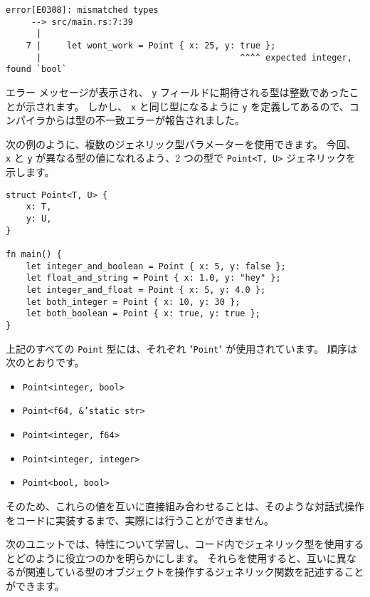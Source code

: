 \begin{lstlisting}[numbers=none]
    error[E0308]: mismatched types
     --> src/main.rs:7:39
      |
    7 |     let wont_work = Point { x: 25, y: true };
      |                                       ^^^^ expected integer, found `bool`
\end{lstlisting}

エラー メッセージが表示され、 \texttt{y} フィールドに期待される型は整数であったことが示されます。 しかし、 \texttt{x} と同じ型になるように \texttt{y} を定義してあるので、コンパイラからは型の不一致エラーが報告されました。

次の例のように、複数のジェネリック型パラメーターを使用できます。 今回、 \texttt{x} と \texttt{y} が異なる型の値になれるよう、2 つの型で \texttt{Point<T, U>} ジェネリックを示します。

\begin{lstlisting}[numbers=none]
struct Point<T, U> {
    x: T,
    y: U,
}

fn main() {
    let integer_and_boolean = Point { x: 5, y: false };
    let float_and_string = Point { x: 1.0, y: "hey" };
    let integer_and_float = Point { x: 5, y: 4.0 };
    let both_integer = Point { x: 10, y: 30 };
    let both_boolean = Point { x: true, y: true };
}
\end{lstlisting}

上記のすべての \texttt{Point} 型には、それぞれ "\texttt{Point}" が使用されています。 順序は次のとおりです。

\begin{itemize}
\item \texttt{Point<integer, bool>}
\item \texttt{Point<f64, \&'static str>}
\item \texttt{Point<integer, f64>}
\item \texttt{Point<integer, integer>}
\item \texttt{Point<bool, bool>}
\end{itemize}

そのため、これらの値を互いに直接組み合わせることは、そのような対話式操作をコードに実装するまで、実際には行うことができません。

次のユニットでは、特性について学習し、コード内でジェネリック型を使用するとどのように役立つのかを明らかにします。 それらを使用すると、互いに異なるが関連している型のオブジェクトを操作するジェネリック関数を記述することができます。

